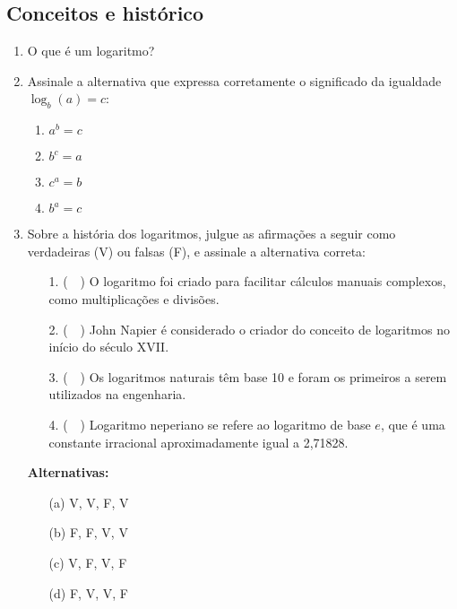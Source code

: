 \documentclass[12pt,a4paper]{article}
\begin{document}
\subsection*{Conceitos e histórico}
\begin{enumerate}
  \item O que é um logaritmo?

  \item Assinale a alternativa que expressa corretamente o significado da igualdade $\log_b(a) = c$:
        \begin{enumerate}
          \item $a^b = c$
          \item $b^c = a$
          \item $c^a = b$
          \item $b^a = c$
        \end{enumerate}

  \item Sobre a história dos logaritmos, julgue as afirmações a seguir como verdadeiras (V) ou falsas (F),
        e assinale a alternativa correta:

        \begin{enumerate}
          \item[1.] (~~) O logaritmo foi criado para facilitar cálculos manuais complexos,
                como multiplicações e divisões.
          \item[2.] (~~) John Napier é considerado o criador do conceito de logaritmos no início do século XVII.
          \item[3.] (~~) Os logaritmos naturais têm base 10 e foram os primeiros a serem utilizados na engenharia.
          \item[4.] (~~) Logaritmo neperiano se refere ao logaritmo de base \(e\), que é uma constante irracional aproximadamente igual a 2{,}71828.
        \end{enumerate}

        \textbf{Alternativas:}
        \begin{enumerate}
          \item[(a)] V, V, F, V
          \item[(b)] F, F, V, V
          \item[(c)] V, F, V, F
          \item[(d)] F, V, V, F
        \end{enumerate}

\end{enumerate}
\end{document}
